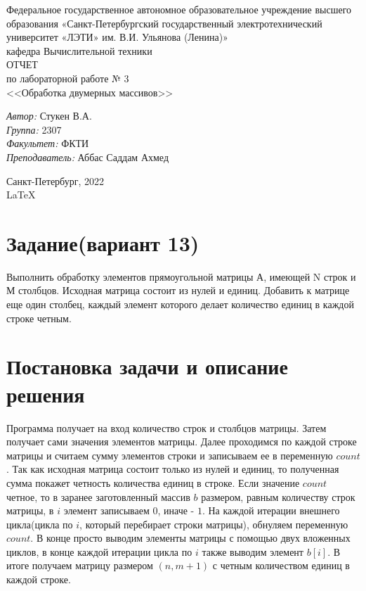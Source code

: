 \documentclass[a4paper,12pt]{report}
\begin{document}
 

\begin{titlepage} 

\begin{center} 

\large Федеральное государственное автономное образовательное учреждение высшего образования «Санкт-Петербургский государственный электротехнический университет «ЛЭТИ» им. В.И. Ульянова (Ленина)»\\
кафедра Вычислительной техники\\[5cm] 

\huge ОТЧЕТ\\ по лабораторной работе № 3\\[0.5cm] 
\large <<Обработка двумерных массивов>>\\[3.7cm]

\begin{minipage}{1\textwidth}
    \begin{flushleft}
        \emph{Автор:} Стукен В.А.\\
        \emph{Группа:} 2307\\
        \emph{Факультет:} ФКТИ\\
        \emph{Преподаватель:} Аббас Саддам Ахмед\\
    \end{flushleft}
\end{minipage}

\vfill

Санкт-Петербург, 2022\\
{\large \LaTeX}

\end{center}
\thispagestyle{empty}
\end{titlepage}

\section*{Задание(вариант 13)}
Выполнить обработку элементов прямоугольной матрицы А, имеющей N строк и М столбцов. Исходная матрица состоит из нулей и единиц. Добавить к матрице еще один столбец, каждый элемент которого делает количество единиц в каждой строке четным.


\section*{Постановка задачи и описание решения}
\par
Программа получает на вход количество строк и столбцов матрицы. Затем получает сами значения элементов матрицы.
Далее проходимся по каждой строке матрицы и считаем сумму элементов строки и записываем ее в переменную $count$. Так как исходная матрица состоит только из нулей и единиц, то полученная сумма покажет четность количества единиц в строке. 
Если значение $count$ четное, то в заранее заготовленный массив $b$ размером, равным количеству строк матрицы, 
в $i$ элемент записываем $0$, иначе - $1$. На каждой итерации внешнего цикла(цикла по $i$, который перебирает строки матрицы), обнуляем переменную $count$.
В конце просто выводим элементы матрицы с помощью двух вложенных циклов, в конце каждой итерации цикла по $i$ также выводим элемент $b[i]$.
В итоге получаем матрицу размером $(n,m+1)$ с четным количеством единиц в каждой строке.
\end{document}
